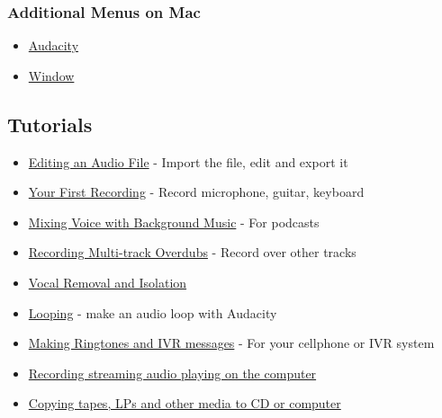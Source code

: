 \begin{multicols}{2}
\subsubsection{Additional Menus on Mac}
\begin{itemize}
\item 
\hyperref[\foo{man:audacity:menu:}]{Audacity}

\item 
\hyperref[\foo{man:window:menu:}]{Window}

\end{itemize}

\label{index:ref:bottom}
\subsection{Tutorials}
\label{index:tutorials}
\label{index:skiptheimage}
\begin{itemize}
\item 
\hyperref[\foo{man:tutorial:editing:an:existing:file:}]{Editing an Audio File}
 - Import the file, edit and export it
\item 
\hyperref[\foo{man:tutorial:your:first:recording:}]{Your First Recording}
 - Record microphone, guitar, keyboard
\item 
\hyperref[\foo{man:tutorial:mixing:a:narration:with:background:music:}]{Mixing Voice with Background Music}
 - For podcasts
\item 
\hyperref[\foo{man:tutorial:recording:multi:track:overdubs:}]{Recording Multi-track Overdubs}
 - Record over other tracks
\item 
\hyperref[\foo{man:tutorial:vocal:removal:and:isolation:}]{Vocal Removal and Isolation}

\item 
\hyperref[\foo{man:tutorial:looping:}]{Looping}
 - make an audio loop with Audacity
\item 
\hyperref[\foo{man:tutorial:making:ringtones:and:ivr:messages:}]{Making Ringtones and IVR messages}
 - For your cellphone or IVR system
\item 
\hyperref[\foo{man:tutorial:recording:audio:playing:on:the:computer:}]{Recording streaming audio playing on the computer}

\end{itemize}

\begin{itemize}
\item 
\hyperref[\foo{man:tutorial:copying:tapes:lps:or:minidiscs:to:cd:}]{Copying tapes, LPs and other media to CD or computer}


\end{itemize}
\end{multicols}
